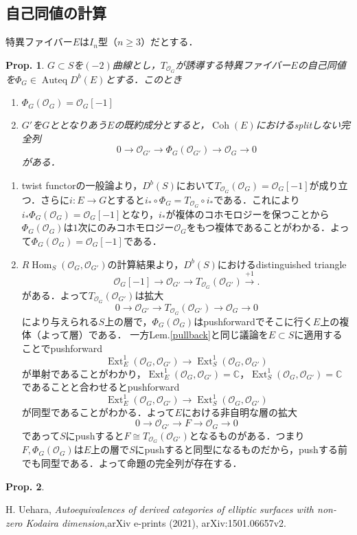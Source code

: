 \documentclass[uplatex,a4paper,11pt,dvipdfmx]{jsarticle}
\makeatletter
\theoremstyle{mystyle} %
\newtheorem{proposition}{Prop.}[section]
\renewenvironment{proof}[1][\proofname]{\par
 \pushQED{\qed}%
 \normalfont \topsep6\p@\@plus6\p@\relax
 \trivlist
 \item[\hskip\labelsep
 \itshape
 {\bf\underline{#1}}]\ignorespaces
}{%
 \popQED\endtrivlist\@endpefalse
}
\DeclareMathOperator{\Auteq}{Auteq}\DeclareMathOperator{\Coh}{Coh}
\DeclareMathOperator{\Hom}{Hom}
\DeclareMathOperator{\Ext}{Ext}
\makeatother
\begin{document}
\subsection{自己同値の計算}
特異ファイバー$E$は$I_n$型（$n\geq 3$）だとする．
\begin{proposition}
	$G \subset S$を$(-2)$曲線とし，$T_{\mathcal{O}_G}$が誘導する特異ファイバー$E$の自己同値を$\Phi_G \in \Auteq D^b(E)$とする．このとき
	\begin{enumerate}
		\item $\Phi_G(\mathcal{O}_G) = \mathcal{O}_G[-1]$
		\item $G'$を$G$ととなりあう$E$の既約成分とすると，$\Coh(E)$におけるsplitしない完全列$$0 \to \mathcal{O}_{G'} \to \Phi_G(\mathcal{O}_{G'}) \to \mathcal{O}_G \to 0$$がある．
	\end{enumerate}
\end{proposition}
\begin{proof}
	\begin{enumerate}
		\item twist functorの一般論より，$D^b(S)$において$T_{\mathcal{O}_G}(\mathcal{O}_G) = \mathcal{O}_G[-1]$が成り立つ．さらに$i \colon E \to G$とすると$i_*\circ \Phi_G = T_{\mathcal{O}_G}\circ i_*$である．これにより$i_*\Phi_G(\mathcal{O}_G) = \mathcal{O}_G[-1]$となり，$i_*$が複体のコホモロジーを保つことから$\Phi_G(\mathcal{O}_G)$は$1$次にのみコホモロジー$\mathcal{O}_G$をもつ複体であることがわかる．よって$\Phi_G(\mathcal{O}_G) = \mathcal{O}_G[-1]$である．
		\item $R\Hom_S(\mathcal{O}_G, \mathcal{O}_{G'})$の計算結果より，$D^b(S)$におけるdistinguished triangle
		      $$ \mathcal{O}_G[-1] \to \mathcal{O}_{G'} \to T_{\mathcal{O}_G}(\mathcal{O}_{G'})\xrightarrow{+1}.$$
		      がある．よって$T_{\mathcal{O}_G}(\mathcal{O}_{G'})$は拡大$$0 \to \mathcal{O}_{G'} \to T_{\mathcal{O}_G}(\mathcal{O}_{G'}) \to \mathcal{O}_G \to 0$$により与えられる$S$上の層で，$\Phi_G(\mathcal{O}_G)$はpushforwardでそこに行く$E$上の複体（よって層）である．
		      一方Lem.\ref{pullback}と同じ議論を$E \subset S$に適用することでpushforward $$\Ext^1_E(\mathcal{O}_G, \mathcal{O}_{G'}) \to \Ext^1_S(\mathcal{O}_G, \mathcal{O}_{G'}) $$が単射であることがわかり，$\Ext^1_E(\mathcal{O}_G, \mathcal{O}_{G'}) = \mathbb{C}$，$\Ext^1_S(\mathcal{O}_G, \mathcal{O}_{G'}) =\mathbb{C}$であることと合わせるとpushforward $$\Ext^1_E(\mathcal{O}_G, \mathcal{O}_{G'}) \to \Ext^1_S(\mathcal{O}_G, \mathcal{O}_{G'}) $$が同型であることがわかる．よって$E$における非自明な層の拡大$$0 \to \mathcal{O}_{G'} \to F \to \mathcal{O}_G \to 0$$であって$S$にpushすると$F \cong T_{\mathcal{O}_G}(\mathcal{O}_{G'})$となるものがある．つまり$F, \Phi_G(\mathcal{O}_G)$は$E$上の層で$S$にpushすると同型になるものだから，pushする前でも同型である．よって命題の完全列が存在する．
	\end{enumerate}
\end{proof}

\begin{proposition}

\end{proposition}
\begin{thebibliography}{99}
	 H. Uehara, \textit{Autoequivalences of derived categories of elliptic surfaces with non-zero Kodaira dimension},arXiv e-prints (2021), arXiv:1501.06657v2.
\end{thebibliography}
\end{document}

